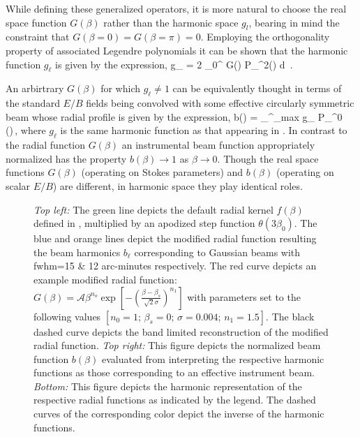 While defining these generalized operators, it is more natural to choose the real space function $G(\beta)$ rather than the harmonic space $g_l$, bearing in mind the constraint that $G(\beta=0)=G(\beta=\pi)=0$. Employing the orthogonality property of associated Legendre polynomials it can be shown that the harmonic function $g_{\ell}$ is given by the expression,
%
\beq
g_{\ell} = 2 \pi {} \int _{0}^{\pi} G(\beta) P_{\ell}^{2}(\cos{\beta}) d\cos{\beta} \,. \label{eq:gb2bl}
\eeq
%


An arbirtrary $G(\beta)$ for which $g_{\ell} \neq 1$ can be equivalently thought in terms of the standard $E/B$ fields being convolved with some effective circularly symmetric beam whose radial profile is given by the expression,
%
\beq
b(\beta) = \sum_{}^{\ell_{\rm max}}  g_{\ell} P_{\ell}^{0} (\cos{\beta})\,,
\eeq
%
where $g_{\ell}$ is the same harmonic function as that appearing in .
In contrast to the radial function $G(\beta)$ an instrumental beam function appropriately normalized has the property $b(\beta) \rightarrow 1$ as $\beta \rightarrow 0$. Though the real space functions $G(\beta)$ (operating on Stokes parameters) and $b(\beta)$ (operating on scalar $E/B$) are different, in harmonic space they play identical roles.
%
\begin{figure}[!t] 
\centering
{}
\caption{\textit{Top left:} The green line depicts the default radial kernel $f(\beta)$ defined in , multiplied by an apodized step function $\theta(3 \beta_0)$. The blue and orange lines depict the modified radial function resulting the beam harmonics $b_{\ell}$ corresponding to Gaussian beams with fwhm=15 \& 12 arc-minutes respectively. The red curve depicts an example modified radial function: $G(\beta)=\mathcal{A} \beta^{n_o} \exp{\left[ -\left( \frac{\beta-\beta_s}{\sqrt{2} \sigma} \right)^{n_1} \right]}$ with parameters set to the following values $[n_0=1;\, \beta_s=0 ;\, \sigma = 0.004 ;\, n_1=1.5]$. The black dashed curve depicts the band limited reconstruction of the modified radial function. \textit{Top right:} This figure depicts the normalized beam function $b(\beta)$ evaluated from interpreting the respective harmonic functions as those corresponding to an effective instrument beam.  \textit{Bottom:} This figure depicts the harmonic representation of the respective radial functions as indicated by the legend. The dashed curves of the corresponding color depict the inverse of the harmonic functions.}
\label{fig:example_gbeta}
\end{figure}
%

